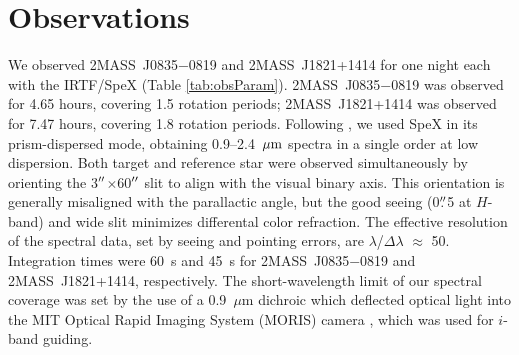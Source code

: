 \documentclass[twocolumn]{aastex6}
\newcommand{\sha}{2MASS~J0835$-$0819}
\newcommand{\shb}{2MASS~J1821+1414}
\begin{document}
\section{Observations}\label{sec:obs}

We observed {\sha} and {\shb} for one night each with the IRTF/SpeX (Table \ref{tab:obsParam}).
{\sha} was observed for 4.65 hours, covering 1.5 rotation periods; {\shb} was observed for 7.47 hours, covering 1.8 rotation periods.
Following \citet{2014ApJ...783....5S}, we used SpeX in its prism-dispersed mode, obtaining 0.9--2.4~$\mbox{$\mu$m}$ spectra in a single order at low dispersion. 
Both target and reference star were observed simultaneously by orienting the 3$\mbox{$^{\prime\prime}$}$$\times$60$\mbox{$^{\prime\prime}$}$ slit to align with the visual binary axis. This orientation is generally misaligned with the parallactic angle, but the good seeing (0$\mbox{$.\!\!^{\prime\prime}$}$5 at $H$-band) and wide slit minimizes differental color refraction. The effective resolution of the spectral data, set by seeing and pointing errors, are $\lambda$/$\Delta\lambda$ $\approx$ 50. Integration times were 60~s and 45~s for {\sha} and {\shb}, respectively. The short-wavelength limit of our spectral coverage was set by the use of a 0.9~$\mu$m dichroic which deflected optical light into the MIT Optical Rapid Imaging System (MORIS) camera \citep{2011PASP..123..461G}, which was used for $i$-band guiding.



\end{document}
